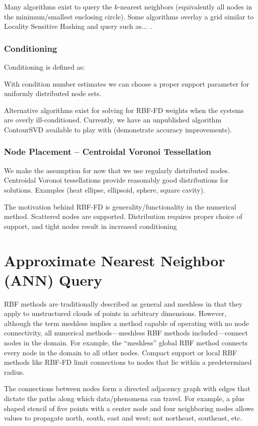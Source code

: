 \documentclass[11pt]{report}
\begin{document}
{Many algorithms exist to query the $k$-nearest neighbors (equivalently all nodes in the minimum/smallest enclosing circle). Some algorithms overlay a grid similar to Locality Sensitive Hashing and query such as... \cite{HarPeledMazumdar2003}.


\subsubsection{Conditioning} 
Conditioning is defined as: 

With condition number estimates we can choose a proper support parameter for uniformly distributed node sets.

Alternative algorithms exist for solving for RBF-FD weights when the systems are overly ill-conditioned. Currently, we have an unpublished algorithm ContourSVD available to play with (demonstrate accuracy improvements). 

\subsubsection{Node Placement -- Centroidal Voronoi Tessellation}
We make the assumption for now that we use regularly distributed nodes. Centroidal Voronoi tessellations provide reasonably good distributions for solutions. Examples (heat ellipse, ellipsoid, sphere, square cavity).

The motivation behind RBF-FD is generality/functionality in the numerical method. Scattered nodes are supported. Distribution requires proper choice of support, and tight nodes result in increased conditioning

\section{Approximate Nearest Neighbor (ANN) Query}

RBF methods are traditionally described as general and meshless in that they apply to unstructured clouds of points in arbitrary dimensions. However, although the term meshless implies a method capable of operating with no node connectivity, all numerical methods---meshless RBF methods included---connect nodes in the domain. For example, the ``meshless'' global RBF method connects every node in the domain to all other nodes. Compact support or local RBF methods like RBF-FD limit connections to nodes that lie within a predetermined radius.

The connections between nodes form a directed adjacency graph with edges that dictate the paths along which data/phenomena can travel. For example, a plus shaped stencil of five points with a center node and four neighboring nodes allows values to propagate north, south, east and west; not northeast, southeast, etc.


}
\end{document}
